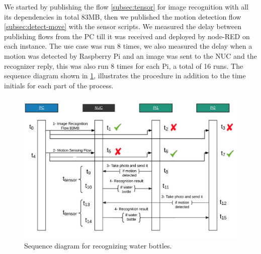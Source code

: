 \noindent We started by publishing the flow \ref{subsec:tensor} for  image recognition with all its dependencies in total 83MB, then we published the motion detection flow \ref{subsec:detect-move} with the sensor scripts. We measured the delay between publishing flows from the PC till it was received and deployed by node-RED on each instance. The use case was run 8 times, we also measured the delay when a motion was detected by Raspberry Pi and an image was sent to the NUC and the recognizer reply, this was also run 8 times for each Pi, a total of 16 runs. The sequence diagram shown in \ref{fig:sd-tensor},  illustrates the procedure in addition to the time initials for each part of the process.  \\



\begin{figure}[H]
	\centering
	\includegraphics[scale=0.6]{images/sequence-diagram.png}
	\caption{Sequence diagram for recognizing water bottles.}
	\label{fig:sd-tensor}
\end{figure} 
 


